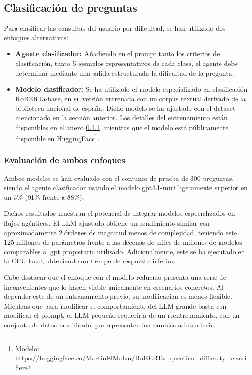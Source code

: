 \subsection{Clasificación de preguntas}
Para clasificar las consultas del usuario por dificultad, se han utilizado dos enfoques alternativos: 

\begin{itemize}
  \item\textbf{Agente clasificador: }Añadiendo en el prompt tanto los criterios de clasificación, tanto 5 ejemplos representativos de cada clase, el agente debe determinar mediante una salida estructurada la dificultad de la pregunta.
  \item\textbf{Modelo clasificador: }Se ha utilizado el modelo especializado en clasificación RoBERTa-base\cite{}, en su versión entrenada con un corpus textual derivado de la biblioteca nacional de españa\cite{}. Dicho modelo se ha ajustado con el dataset mencionado en la sección anterior. Los detalles del entrenamiento están disponibles en el anexo \ref{}, mientras que el modelo está públicamente disponible en HuggingFace\footnote{Modelo: \url{https://huggingface.co/MartinElMolon/RoBERTa_question_difficulty_classifier}}.
\end{itemize}

\subsubsection{Evaluación de ambos enfoques}
Ambos modelos se han evaluado con el conjunto de prueba de 300 preguntas, siendo el agente clasificador usando el modelo gpt4.1-mini ligeramente superior en un 3\% (91\% frente a 88\%).

Dichos resultados muestran el potencial de integrar modelos especializados en flujos agénticos. El LLM ajustado obtiene un rendimiento similar con aproximadamente 2 órdenes de magnitud menos de complejidad, teniendo este 125 millones de parámetros frente a las decenas de miles de millones de modelos comparables al gpt propietario utilizado. Adicionalmente, este se ha ejecutado en la CPU local, obteniendo un tiempo de respuesta inferior. 

Cabe destacar que el enfoque con el modelo reducido presenta una serie de inconvenientes que lo hacen viable únicamente en escenarios concretos. Al depender este de un entrenamiento previo, su modificación es menos flexible. Mientras que para modificar el comportamiento del LLM grande basta con modificar el prompt, el LLM pequeño requeriría de un reentrenamiento, con un conjunto de datos modificado que representen los cambios a introducir. 




